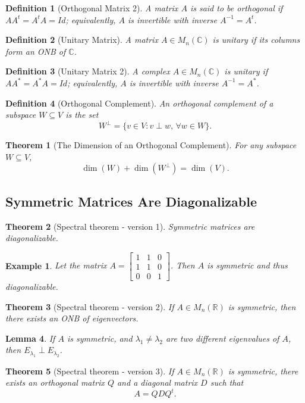\documentclass{article}
\newtheorem{theorem}{Theorem}
\newtheorem{lemma}[theorem]{Lemma}
\newtheorem{definition}{Definition}
\newtheorem*{example}{Example}
\begin{document}
\begin{definition}[Orthogonal Matrix 2]
    A matrix $A$ is said to be orthogonal if $AA^t = A^tA = Id$; equivalently, $A$ is invertible with inverse $A^{-1} = A^t$.
\end{definition}
\begin{definition}[Unitary Matrix]
    A matrix $A \in M_n(\mathbb{C})$ is unitary if its columns form an ONB of $\mathbb{C}$.
\end{definition}
\begin{definition}[Unitary Matrix 2]
    A complex $A \in M_n(\mathbb{C})$ is unitary if $AA^\ast = A^\ast A = Id$; equivalently, $A$ is invertible with inverse $A^{-1} = A^\ast$.
\end{definition}
\begin{definition}[Orthogonal Complement]
    An orthogonal complement of a subspace $W \subseteq V$ is the set
    \[W^\perp = \{v\in V : v\perp w,\,\forall w\in W\}.\]
\end{definition}
\begin{theorem}[The Dimension of an Orthogonal Complement]
    For any subspace $W\subseteq V$,
    \[\dim(W) + \dim(W^\perp) = \dim(V).\]
\end{theorem}

\subsection{Symmetric Matrices Are Diagonalizable}
\begin{theorem}[Spectral theorem - version 1]
    Symmetric matrices are diagonalizable.
\end{theorem}
\begin{example}
    Let the matrix $A = \begin{bmatrix} 1 & 1 & 0 \\ 1 & 1 & 0 \\ 0 & 0 & 1 \end{bmatrix}$. Then $A$ is symmetric and thus diagonalizable.
\end{example}
\begin{theorem}[Spectral theorem - version 2]
    If $A \in M_n(\mathbb{R})$ is symmetric, then there exists an ONB of eigenvectors.
\end{theorem}
\begin{lemma}
    If $A$ is symmetric, and $\lambda_1 \neq \lambda_2$ are two different eigenvalues of $A$, then $E_{\lambda_1} \perp E_{\lambda_2}$.
\end{lemma}
\begin{theorem}[Spectral theorem - version 3]
    If $A \in M_n(\mathbb{R})$ is symmetric, there exists an orthogonal matrix $Q$ and a diagonal matrix $D$ such that 
    \[A = QDQ^t.\]
\end{theorem}
\end{document}
